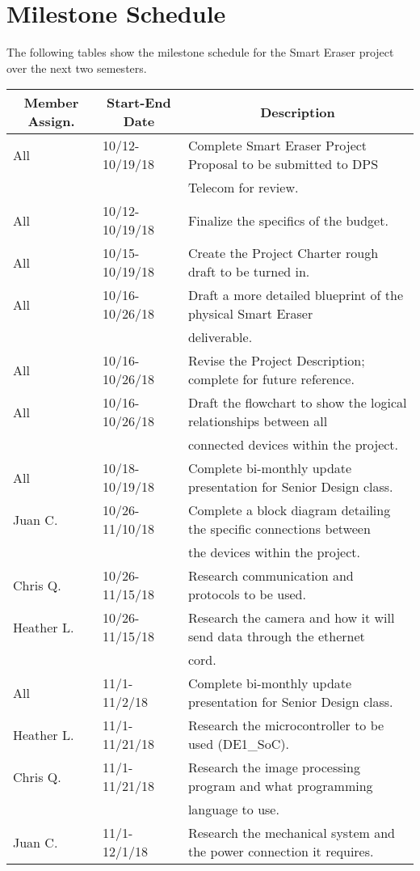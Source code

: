 \section{Milestone Schedule}
The following tables show the milestone schedule for the Smart Eraser project over the next two semesters.
\setlength{\parindent}{5ex}
\begin{table} [H]	
	\normalsize
	\centering
	\begin{tabular}{|l|l|l|}
		\hline
		\multicolumn{1}{|c|}{\textbf{Member Assign.}} & \multicolumn{1}{|c|}{\textbf{Start-End Date}} & \multicolumn{1}{|c|}{\textbf{Description}} \\
		\hline
		All & 10/12-10/19/18 & Complete Smart Eraser Project Proposal to be submitted to DPS\\
		& & Telecom for review. \\
		\hline
		All & 10/12-10/19/18 & Finalize the specifics of the budget. \\
		\hline
		All & 10/15-10/19/18 & 
		Create the Project Charter rough draft to be turned in.\\
		\hline
		All & 10/16-10/26/18 & Draft a more detailed blueprint of the physical Smart Eraser \\
		& & deliverable. \\
		\hline
		All & 10/16-10/26/18 & 
		Revise the Project Description; complete for future reference.\\
		\hline
		All & 10/16-10/26/18 & 
		Draft the flowchart to show the logical relationships between all \\
		& & connected devices within the project.\\
		\hline
		All & 10/18-10/19/18 & 
		Complete bi-monthly update presentation for Senior Design class.\\
		\hline
		Juan C. & 10/26-11/10/18 & 
		Complete a block diagram detailing the specific connections between \\
		& & the devices within the project.\\
		\hline
		Chris Q. & 10/26-11/15/18 & 
		Research communication and protocols to be used.\\
		\hline
		Heather L. & 10/26-11/15/18 & 
		Research the camera and how it will send data through the ethernet \\
		& & cord.\\
		\hline
		All & 11/1-11/2/18 & 
		Complete bi-monthly update presentation for Senior Design class.\\
		\hline
		Heather L. & 11/1-11/21/18 & 
		Research the microcontroller to be used  (DE1\_SoC).\\
		\hline
		Chris Q. & 11/1-11/21/18 & 
		Research the image processing program and what programming \\
		& & language to use.\\
		\hline
		Juan C. & 11/1-12/1/18 &
		Research the mechanical system and the power connection it requires. \\
		\hline
		

\end{tabular}
\end{table}

